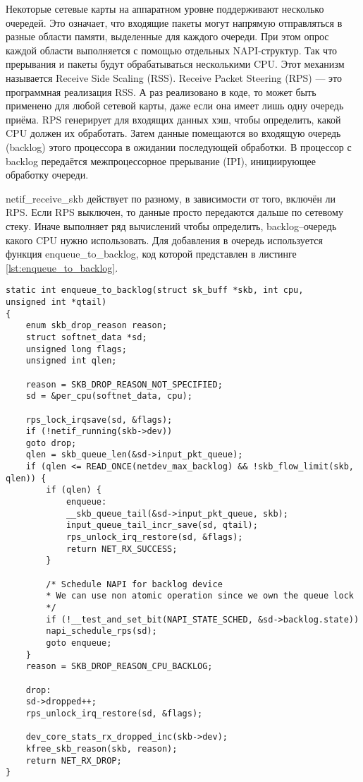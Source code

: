 Некоторые сетевые карты на аппаратном уровне поддерживают несколько очередей. Это означает, что входящие пакеты могут напрямую отправляться в разные области памяти, выделенные для каждого очереди. При этом опрос каждой области выполняется с помощью отдельных NAPI-структур. Так что прерывания и пакеты будут обрабатываться несколькими CPU. Этот механизм называется Receive Side Scaling (RSS). Receive Packet Steering (RPS) --- это программная реализация RSS. А раз реализовано в коде, то может быть применено для любой сетевой карты, даже если она имеет лишь одну очередь приёма. RPS генерирует для входящих данных хэш, чтобы определить, какой CPU должен их обработать. Затем данные помещаются во входящую очередь (backlog) этого процессора в ожидании последующей обработки. В процессор с backlog передаётся межпроцессорное прерывание (IPI), инициирующее обработку очереди.

netif\_receive\_skb действует по разному, в зависимости от того, включён ли RPS. Если RPS выключен, то данные просто передаются дальше по сетевому стеку. Иначе выполняет ряд вычислений чтобы определить, backlog--очередь какого CPU нужно использовать. Для добавления в очередь используется функция enqueue\_to\_backlog, код которой представлен в листинге \ref{lst:enqueue_to_backlog}.

\begin{center}
	\captionsetup{justification=raggedright,singlelinecheck=off}
	\begin{lstlisting}[label=lst:enqueue_to_backlog,caption=Функция enqueue\_to\_backlog,showstringspaces=false]
static int enqueue_to_backlog(struct sk_buff *skb, int cpu,
unsigned int *qtail)
{
	enum skb_drop_reason reason;
	struct softnet_data *sd;
	unsigned long flags;
	unsigned int qlen;
	
	reason = SKB_DROP_REASON_NOT_SPECIFIED;
	sd = &per_cpu(softnet_data, cpu);
	
	rps_lock_irqsave(sd, &flags);
	if (!netif_running(skb->dev))
	goto drop;
	qlen = skb_queue_len(&sd->input_pkt_queue);
	if (qlen <= READ_ONCE(netdev_max_backlog) && !skb_flow_limit(skb, qlen)) {
		if (qlen) {
			enqueue:
			__skb_queue_tail(&sd->input_pkt_queue, skb);
			input_queue_tail_incr_save(sd, qtail);
			rps_unlock_irq_restore(sd, &flags);
			return NET_RX_SUCCESS;
		}
		
		/* Schedule NAPI for backlog device
		* We can use non atomic operation since we own the queue lock
		*/
		if (!__test_and_set_bit(NAPI_STATE_SCHED, &sd->backlog.state))
		napi_schedule_rps(sd);
		goto enqueue;
	}
	reason = SKB_DROP_REASON_CPU_BACKLOG;
	
	drop:
	sd->dropped++;
	rps_unlock_irq_restore(sd, &flags);
	
	dev_core_stats_rx_dropped_inc(skb->dev);
	kfree_skb_reason(skb, reason);
	return NET_RX_DROP;
}
	\end{lstlisting}
\end{center}
\FloatBarrier

